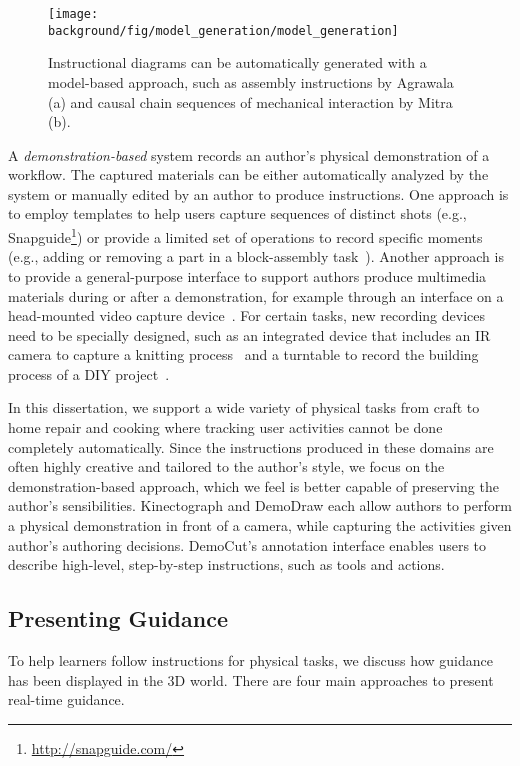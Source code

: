\begin{figure*}[b!]
  \centering
  \texttt{[image: \\background/fig/model\_generation/model\_generation]}
  \caption{Instructional diagrams can be automatically generated with a model-based approach, such as assembly instructions by Agrawala \ea~\cite{agrawala2003designing} (a) and causal chain sequences of mechanical interaction by Mitra \ea~\cite{mitra2010illustrating} (b).}
  \label{fig:related_models}
\end{figure*}

A \emph{demonstration-based} system records an author's physical demonstration of a workflow. The captured materials can be either automatically analyzed by the system or manually edited by an author to produce instructions.
%
One approach is to employ templates to help users capture sequences of distinct shots (e.g., Snapguide\footnote{\url{http://snapguide.com/}}) or provide a limited set of operations to record specific moments (e.g., adding or removing a part in a block-assembly task~\cite{Ranjan:2007,Gupta2012DuploTrack}).
%
Another approach is to provide a general-purpose interface to support authors produce multimedia materials during or after a demonstration, for example through an interface on a head-mounted video capture device~\cite{carter2015authoring}. For certain tasks, new recording devices need to be specially designed, such as an integrated device that includes an IR camera to capture a knitting process~\cite{Rosner:2008:SAK:1409635.1409682} and a turntable to record the building process of a DIY project~\cite{Tseng:2015:SPT:2771839.2771869}.

In this dissertation, we support a wide variety of physical tasks from craft to home repair and cooking where tracking user activities cannot be done completely automatically. Since the instructions produced in these domains are often highly creative and tailored to the author's style, we focus on the demonstration-based approach, which we feel is better capable of preserving the author's sensibilities.
%
Kinectograph and DemoDraw each allow authors to perform a physical demonstration in front of a camera, while capturing the activities given author's authoring decisions. DemoCut's annotation interface enables users to describe high-level, step-by-step instructions, such as tools and actions.


\subsection{Presenting Guidance}
To help learners follow instructions for physical tasks, we discuss how guidance has been displayed in the 3D world. There are four main approaches to present real-time guidance.

